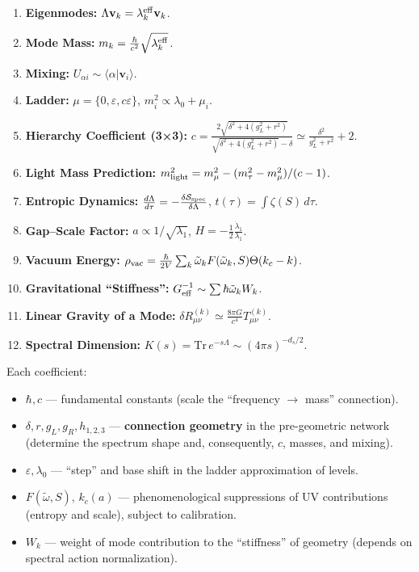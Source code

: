 \documentclass[12pt,a4paper]{article}
\begin{document}
\begin{enumerate}
    \item \textbf{Eigenmodes:} \(\Lambda \mathbf{v}_k = \lambda_k^{\rm eff} \mathbf{v}_k\).
    \item \textbf{Mode Mass:} \(m_k = \frac{\hbar}{c^2} \sqrt{\lambda_k^{\rm eff}}\).
    \item \textbf{Mixing:} \(U_{\alpha i} \sim \langle \alpha | \mathbf{v}_i \rangle\).
    \item \textbf{Ladder:} \(\mu = \{0, \varepsilon, c \varepsilon \}\), \(m_i^2 \propto \lambda_0 + \mu_i\).
    \item \textbf{Hierarchy Coefficient (3×3):} \(c = \frac{2 \sqrt{\delta^2 + 4(g_L^2 + r^2)}}{\sqrt{\delta^2 + 4(g_L^2 + r^2)} - \delta} \simeq \frac{\delta^2}{g_L^2 + r^2} + 2\).
    \item \textbf{Light Mass Prediction:} \(m_{\rm light}^2 = m_\mu^2 - (m_\tau^2 - m_\mu^2)/(c - 1)\).
    \item \textbf{Entropic Dynamics:} \(\frac{d \Lambda}{d \tau} = -\frac{\delta \mathcal{S}_{\rm spec}}{\delta \Lambda}\), \(t(\tau) = \int \zeta(S) \, d\tau\).
    \item \textbf{Gap–Scale Factor:} \(a \propto 1/\sqrt{\lambda_1}\), \(H = -\frac{1}{2} \frac{\dot{\lambda}_1}{\lambda_1}\).
    \item \textbf{Vacuum Energy:} \(\rho_{\rm vac} = \frac{\hbar}{2 V} \sum_k \tilde{\omega}_k F(\tilde{\omega}_k, S) \Theta(k_c - k)\).
    \item \textbf{Gravitational ``Stiffness'':} \(G_{\rm eff}^{-1} \sim \sum \hbar \tilde{\omega}_k W_k\).
    \item \textbf{Linear Gravity of a Mode:} \(\delta R_{\mu\nu}^{(k)} \simeq \frac{8 \pi G}{c^4} T_{\mu\nu}^{(k)}\).
    \item \textbf{Spectral Dimension:} \(K(s) = \mathrm{Tr} \, e^{-s \Lambda} \sim (4 \pi s)^{-d_s/2}\).
\end{enumerate}

Each coefficient:
\begin{itemize}
    \item \(\hbar, c\) — fundamental constants (scale the ``frequency \(\to\) mass'' connection).
    \item \(\delta, r, g_L, g_R, h_{1,2,3}\) — \textbf{connection geometry} in the pre-geometric network (determine the spectrum shape and, consequently, \(c\), masses, and mixing).
    \item \(\varepsilon, \lambda_0\) — ``step'' and base shift in the ladder approximation of levels.
    \item \(F(\tilde{\omega}, S)\), \(k_c(a)\) — phenomenological suppressions of UV contributions (entropy and scale), subject to calibration.
    \item \(W_k\) — weight of mode contribution to the ``stiffness'' of geometry (depends on spectral action normalization).
\end{itemize}
\end{document}
